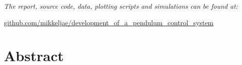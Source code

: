 \vspace{1cm}
  \begin{center}
    \textsl{The report, source code, data, plotting scripts and simulations can be found at:}  
    \end{center}
    \vspace{-5pt}
    \begin{center}
	\renewcommand{\UrlFont}{\color{black}\normalsize\tt}
    \url{github.com/mikkeljae/development_of_a_pendulum_control_system}
   \end{center}
\newpage

\section*{Abstract}
\lipsum[5]

